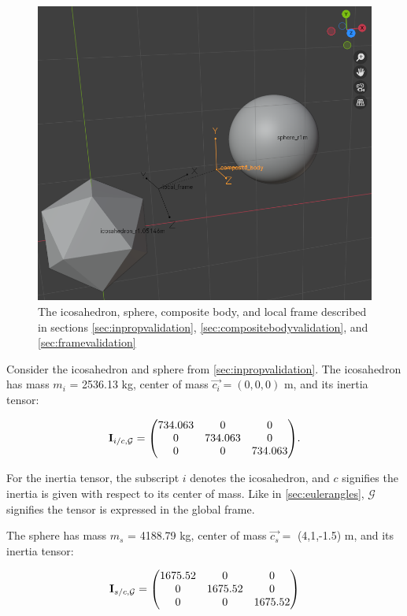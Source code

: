 \documentclass{article}
\begin{document}
\begin{figure}[htbp]
    \centering
    \includegraphics[width=\textwidth]{figures/composite_body.png} %
    \caption{The icosahedron, sphere, composite body, and local frame described in sections \ref{sec:inpropvalidation}, \ref{sec:compositebodyvalidation}, and \ref{sec:framevalidation}}
    \label{fig:icoandsphere}
\end{figure}


Consider the icosahedron and sphere from \ref{sec:inpropvalidation}. The icosahedron has mass \(m_{i}\) = 2536.13 \si{kg}, center of mass \(\vec{c_{i}} =  (0,0,0)\)  \si{m}, and its inertia tensor:

\begin{equation}
    \mathbf{I}_{i/c,{\mathcal{G}}} = \mqty(
    734.063 & 0 & 0 \\
    0 & 734.063 & 0 \\
    0 & 0 & 734.063
    ).
\end{equation}

For the inertia tensor, the subscript \(i\) denotes the icosahedron, and \(c\) signifies the inertia is given with respect to its center of mass. Like in \ref{sec:eulerangles}, \(\mathcal{G}\) signifies the tensor is expressed in the global frame.

The sphere has mass \(m_{s}\) = 4188.79 \si{kg}, center of mass \(\vec{c_{s}} =\) (4,1,-1.5) \si{m}, and its inertia tensor:

\begin{equation}
    \mathbf{I}_{s/c,{\mathcal{G}}} = \mqty(
    1675.52 & 0 & 0 \\
    0 & 1675.52 & 0 \\
    0 & 0 & 1675.52
    )
\end{equation}
\end{document}
